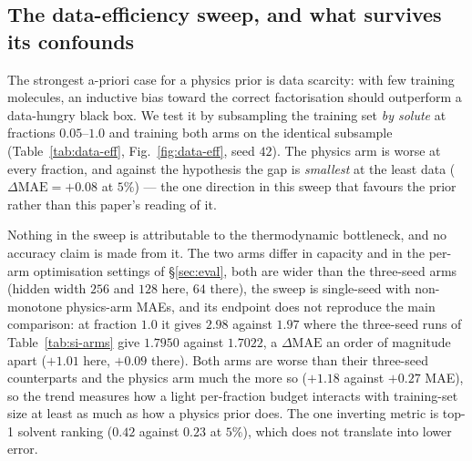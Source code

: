 \subsection{The data-efficiency sweep, and what survives its confounds}
\label{sec:data-efficiency}
The strongest a-priori case for a physics prior is data scarcity: with few training molecules, an
inductive bias toward the correct factorisation should outperform a data-hungry black box. We test
it by subsampling the training set \emph{by solute} at fractions $0.05$--$1.0$ and training both
arms on the identical subsample (Table~\ref{tab:data-eff}, Fig.~\ref{fig:data-eff}, seed $42$). The
physics arm is worse at every fraction, and against the hypothesis the gap is \emph{smallest} at the
least data ($\Delta\mathrm{MAE}=+0.08$ at $5\%$) --- the one direction in this sweep that favours
the prior rather than this paper's reading of it.

Nothing in the sweep is attributable to the thermodynamic bottleneck, and no accuracy claim is made
from it. The two arms differ in capacity and in the per-arm optimisation settings of
\S\ref{sec:eval}, both are wider than the three-seed arms (hidden width $256$ and $128$ here, $64$
there), the sweep is single-seed with non-monotone physics-arm MAEs, and its endpoint does not
reproduce the main comparison: at fraction $1.0$ it gives $2.98$ against $1.97$ where the three-seed
runs of Table~\ref{tab:si-arms} give $1.7950$ against $1.7022$, a $\Delta\mathrm{MAE}$ an order of
magnitude apart ($+1.01$ here, $+0.09$ there). Both arms are worse than their three-seed
counterparts and the physics arm much the more so ($+1.18$ against $+0.27$ MAE), so the trend
measures how a light per-fraction budget interacts with training-set size at least as much as how a
physics prior does. The one inverting metric is top-1 solvent ranking ($0.42$ against $0.23$ at
$5\%$), which does not translate into lower error.

